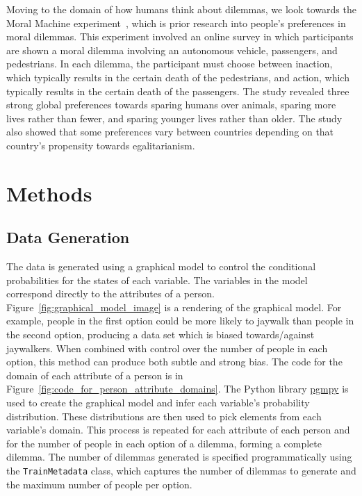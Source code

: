 \documentclass[]{report}
\newcommand{\code}{\texttt}
\begin{document}
Moving to the domain of how humans think about dilemmas, we look towards the Moral Machine
experiment~\cite{awad2018moral}, which is prior research into people's preferences in moral
dilemmas. This experiment involved an online survey in which participants are shown a moral dilemma
involving an autonomous vehicle, passengers, and pedestrians. In each dilemma, the participant must
choose between inaction, which typically results in the certain death of the pedestrians, and
action, which typically results in the certain death of the passengers. The study revealed three
strong global preferences towards sparing humans over animals, sparing more lives rather than fewer,
and sparing younger lives rather than older. The study also showed that some preferences vary
between countries depending on that country's propensity towards egalitarianism.

\FloatBarrier
\chapter{Methods}

\section{Data Generation}

The data is generated using a graphical model to control the conditional probabilities for the
states of each variable. The variables in the model correspond directly to the attributes of a
person. Figure~\ref{fig:graphical_model_image} is a rendering of the graphical model. For example,
people in the first option could be more likely to jaywalk than people in the second option,
producing a data set which is biased towards/against jaywalkers. When combined with control over the
number of people in each option, this method can produce both subtle and strong bias. The code for
the domain of each attribute of a person is in Figure~\ref{fig:code_for_person_attribute_domains}.
The Python library \href{https://github.com/pgmpy/pgmpy}{pgmpy} is used to create the graphical
model and infer each variable’s probability distribution. These distributions are then used to pick
elements from each variable’s domain. This process is repeated for each attribute of each person and
for the number of people in each option of a dilemma, forming a complete dilemma. The number of
dilemmas generated is specified programmatically using the \code{TrainMetadata} class, which
captures the number of dilemmas to generate and the maximum number of people per option.
\end{document}
